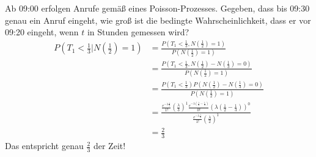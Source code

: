\documentclass[a4paper,12pt]{article}
\begin{document}
\begin{tcolorbox}[breakable, colframe=blue, colback=white, title=Beispiel 20]
Ab 09:00 erfolgen Anrufe gemäß eines Poisson-Prozesses. Gegeben, dass bis 09:30
genau ein Anruf eingeht, wie groß ist die bedingte Wahrscheinlichkeit, dass er vor 09:20
eingeht, wenn $t$ in Stunden gemessen wird?
\begin{align*}
P(T_1 < \frac{1}{3}| N\left(\frac{1}{2}\right) = 1)
& = \frac{P \left(T_1 < \frac{1}{3}, N\left(\frac{1}{2}\right)=1\right) }{P\left( N\left(\frac{1}{2}\right)=1\right)}\\
& = \frac{P \left(T_1 < \frac{1}{3}, N\left(\frac{1}{2}\right) - N\left(\frac{1}{3}\right)=0\right) }{P\left( N\left(\frac{1}{2}\right)=1\right)}\\
& = \frac{P \left(T_1 < \frac{1}{3}\right) P\left(N\left(\frac{1}{2}\right) - N\left(\frac{1}{3}\right)=0\right) }{P\left( N\left(\frac{1}{2}\right)=1\right)}\\
& = \frac{
\frac{e^{-\lambda \frac{1}{3}}}{1!}\left(\frac{\lambda}{3}\right)^1 
\frac{e^{-\lambda \left(\frac{1}{2} - \frac{1}{3}\right)}}{0!}\left(\lambda\left(\frac{1}{2} - \frac{1}{3}\right) \right)^0	
}
{\frac{e^{-\lambda \frac{1}{2}}}{1!}\left(\frac{\lambda}{2}\right)^{1}} \\
& = \frac{2}{3}
\end{align*}
Das entspricht genau $\frac{2}{3}$ der Zeit!
\end{tcolorbox}
\end{document}
